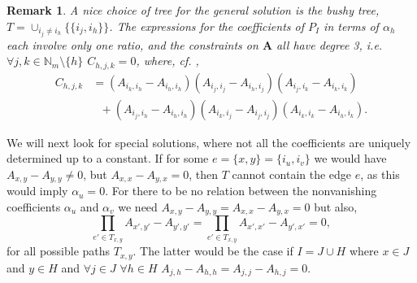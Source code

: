 \documentclass{article}
\newcounter{NN}
\newtheorem{remark}[NN]{Remark}
\def\N{\mathbb{N}}
\def\A{\mathbf{A}}
\begin{document}
\begin{remark} \label{oc}
A nice choice of tree for the general solution is the bushy tree, $T=\cup_{i_j\neq i_h} \{\{i_j,i_h\}\}$. The expressions for the coefficients of $P_I$ in terms of $\alpha_h$ each involve only one ratio, and the constraints on $\A$ all have degree 3, i.e. $\forall j,k\in \N_m\setminus\{h\}$ $C_{h,j,k}=0$, where, cf. \cite[Eq. (1.5)]{Mai},
\begin{equation}\label{rc}
\begin{split}
C_{h,j,k}&=(A_{i_k,i_h}-A_{i_h,i_h})(A_{i_j,i_j}-A_{i_h,i_j})
(A_{i_j,i_k}-A_{i_k,i_k}) \\
&\ \ \ +(A_{i_j,i_h}-A_{i_h,i_h})
(A_{i_k,i_j}-A_{i_j,i_j})(A_{i_k,i_k}-A_{i_h,i_k}).
\end{split}
\end{equation}
\end{remark}

We will next look for special solutions, where not all the coefficients are uniquely determined up to a constant. If for some $e=\{x,y\}=\{i_u,i_v\}$ we would have $A_{x,y}-A_{y,y}\neq 0$, but $A_{x,x}-A_{y,x}= 0$, then $T$ cannot contain the edge $e$, as this would imply $\alpha_{u}=0$. For there to be no relation between the nonvanishing coefficients $\alpha_{u}$ and $\alpha_v$ we need
$A_{x,y}-A_{y,y}=A_{x,x}-A_{y,x}= 0$ but also,
\[
\prod_{e'\in T_{x,y}} A_{x',y'}-A_{y',y'}= \prod_{e'\in T_{x,y}} A_{x',x'}-A_{y',x'} = 0,
\]
for all possible paths $T_{x,y}$. The latter would be the case if $I=J\cup H$ where $x\in J$ and $y\in H$ and $\forall j\in J$ $\forall h\in H$ $A_{j,h}-A_{h,h}=A_{j,j}-A_{h,j}= 0$.
\end{document}
